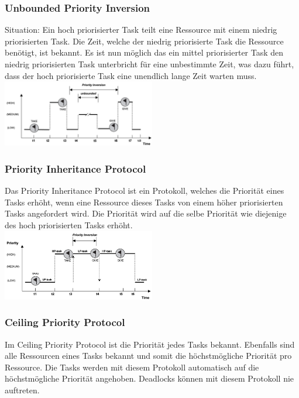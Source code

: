 \subsubsection{Unbounded Priority Inversion}
Situation: Ein hoch priorisierter Task teilt eine Ressource mit einem niedrig priorisierten Task. Die Zeit, welche der niedrig priorisierte Task die Ressource benötigt, ist bekannt. Es ist nun möglich das ein mittel priorisierter Task den niedrig priorisierten Task unterbricht für eine unbestimmte Zeit, was dazu führt, dass der hoch priorisierte Task eine unendlich lange Zeit warten muss. \\
\includegraphics[width=0.5\textwidth]{images/Betriebssysteme/unbounded_priority.png}

\subsubsection{Priority Inheritance Protocol}
Das Priority Inheritance Protocol ist ein Protokoll, welches die Priorität eines Tasks erhöht, wenn eine Ressource dieses Tasks von einem höher priorisierten Tasks angefordert wird. Die Priorität wird auf die selbe Priorität wie diejenige des hoch priorisierten Tasks erhöht. \\
\includegraphics[width=0.5\textwidth]{images/Betriebssysteme/priority_inheritance.png}

\subsubsection{Ceiling Priority Protocol}
Im Ceiling Priority Protocol ist die Priorität jedes Tasks bekannt. Ebenfalls sind alle Ressourcen eines Tasks bekannt und somit die höchstmögliche Priorität pro Ressource. Die Tasks werden mit diesem Protokoll automatisch auf die höchstmögliche Priorität angehoben. Deadlocks können mit diesem Protokoll nie auftreten.

